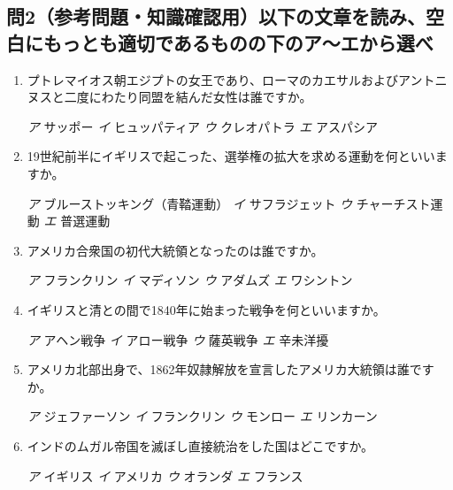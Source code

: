 \documentclass[dvipdfmx,uplatex]{bxjsarticle}
\newcommand{\sentakusi}[4]{
\hspace{.3zw}
\emph{ア}\hspace{1zw} #1 \hspace{2zw} \emph{イ} \hspace{1zw}#2 \hspace{2zw}\emph{ウ}\hspace{1zw} #3 \hspace{2zw}\emph{エ}\hspace{1zw} #4

}
\begin{document}
\subsection*{問2（参考問題・知識確認用）以下の文章を読み、空白にもっとも適切であるものの下のア〜エから選べ}

\begin{enumerate}


  
\setlength{\parskip}{.4zw}
\setlength{\itemsep}{.4zw}



  



\item プトレマイオス朝エジプトの女王であり、ローマのカエサルおよびアントニヌスと二度にわたり同盟を結んだ女性は誰ですか。

  \sentakusi{サッポー}{ヒュッパティア}{クレオパトラ}{アスパシア}



\item 19世紀前半にイギリスで起こった、選挙権の拡大を求める運動を何といいますか。

\sentakusi{ブルーストッキング（青鞜運動）}{サフラジェット}{チャーチスト運動}{普選運動}



\item アメリカ合衆国の初代大統領となったのは誰ですか。

\sentakusi{フランクリン}{マディソン}{アダムズ}{ワシントン}


\item イギリスと清との間で1840年に始まった戦争を何といいますか。

\sentakusi{アヘン戦争}{アロー戦争}{薩英戦争}{辛未洋擾}


\item アメリカ北部出身で、1862年奴隷解放を宣言したアメリカ大統領は誰ですか。

\sentakusi{ジェファーソン}{フランクリン}{モンロー}{リンカーン}


\item インドのムガル帝国を滅ぼし直接統治をした国はどこですか。

\sentakusi{イギリス}{アメリカ}{オランダ}{フランス}





\end{enumerate}
\end{document}
